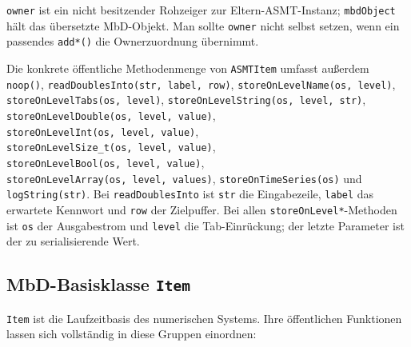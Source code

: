 \documentclass[
  12pt
]{book}
\begin{document}
\texttt{owner} ist ein nicht besitzender Rohzeiger zur
Eltern-ASMT-Instanz; \texttt{mbdObject} hält das übersetzte MbD-Objekt.
Man sollte \texttt{owner} nicht selbst setzen, wenn ein passendes
\texttt{add*()} die Ownerzuordnung übernimmt.

Die konkrete öffentliche Methodenmenge von \texttt{ASMTItem} umfasst
außerdem \texttt{noop()}, \texttt{readDoublesInto(str,\ label,\ row)},
\texttt{storeOnLevelName(os,\ level)},
\texttt{storeOnLevelTabs(os,\ level)},
\texttt{storeOnLevelString(os,\ level,\ str)},
\texttt{storeOnLevelDouble(os,\ level,\ value)},
\texttt{storeOnLevelInt(os,\ level,\ value)},
\texttt{storeOnLevelSize\_t(os,\ level,\ value)},
\texttt{storeOnLevelBool(os,\ level,\ value)},
\texttt{storeOnLevelArray(os,\ level,\ values)},
\texttt{storeOnTimeSeries(os)} und \texttt{logString(str)}. Bei
\texttt{readDoublesInto} ist \texttt{str} die Eingabezeile,
\texttt{label} das erwartete Kennwort und \texttt{row} der Zielpuffer.
Bei allen \texttt{storeOnLevel*}-Methoden ist \texttt{os} der
Ausgabestrom und \texttt{level} die Tab-Einrückung; der letzte Parameter
ist der zu serialisierende Wert.

\hypertarget{mbd-basisklasse-item}{%
\subsection*{\texorpdfstring{MbD-Basisklasse
\texttt{Item}}{MbD-Basisklasse Item}}\label{mbd-basisklasse-item}}

\texttt{Item} ist die Laufzeitbasis des numerischen Systems. Ihre
öffentlichen Funktionen lassen sich vollständig in diese Gruppen
einordnen:
\end{document}
